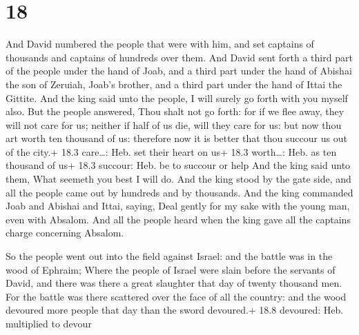 \hypertarget{section-17}{%
\section{18}\label{section-17}}

 And David numbered the people that were with him, and set
captains of thousands and captains of hundreds over them. 
And David sent forth a third part of the people under the hand of Joab,
and a third part under the hand of Abishai the son of Zeruiah, Joab's
brother, and a third part under the hand of Ittai the Gittite. And the
king said unto the people, I will surely go forth with you myself also.
 But the people answered, Thou shalt not go forth: for if we
flee away, they will not care for us; neither if half of us die, will
they care for us: but now thou art worth ten thousand of us: therefore
now it is better that thou succour us out of the city.+ 18.3 care\ldots:
Heb. set their heart on us+ 18.3 worth\ldots: Heb. as ten thousand of
us+ 18.3 succour: Heb. be to succour or help  And the king
said unto them, What seemeth you best I will do. And the king stood by
the gate side, and all the people came out by hundreds and by thousands.
 And the king commanded Joab and Abishai and Ittai, saying,
Deal gently for my sake with the young man, even with Absalom. And all
the people heard when the king gave all the captains charge concerning
Absalom.

 So the people went out into the field against Israel: and
the battle was in the wood of Ephraim;  Where the people of
Israel were slain before the servants of David, and there was there a
great slaughter that day of twenty thousand men.  For the
battle was there scattered over the face of all the country: and the
wood devoured more people that day than the sword devoured.+ 18.8
devoured: Heb. multiplied to devour

